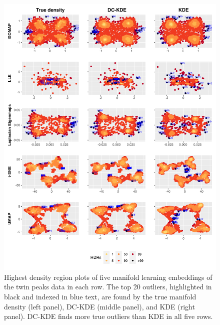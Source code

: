 \documentclass[12pt]{article}
\begin{document}
\begin{figure}[!p]

{\centering \includegraphics[width=0.85\linewidth]{figures/Twin Peak2000_5levels_outliers_comparison_5ml_r0_5} 

}

\caption{Highest density region plots of five manifold learning embeddings of the twin peaks data in each row. The top 20 outliers, highlighted in black and indexed in blue text, are found by the true manifold density (left panel), DC-KDE (middle panel), and KDE (right panel). DC-KDE finds more true outliers than KDE in all five rows.}\label{fig:tpoutliers}
\end{figure}
\end{document}
